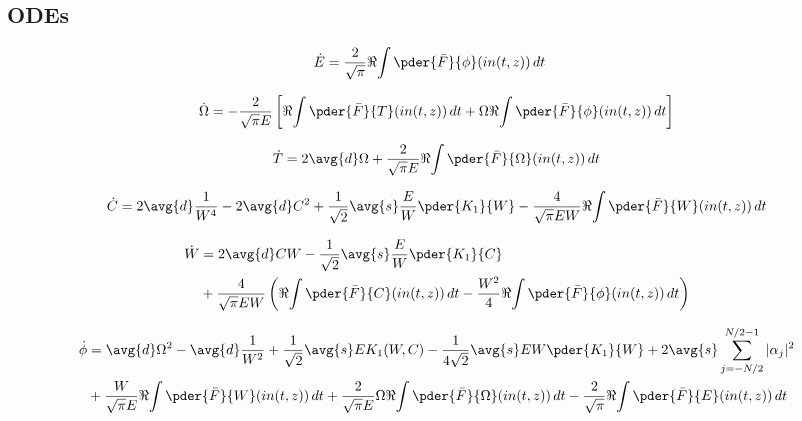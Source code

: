 \subsection{ODEs}


\begin{equation}
\begin{split}
\dot{E} &= \frac{2}{\sqrt{\pi}}\Re{\int \pder{\bar{F}}{\phi} (in(t,z))\,dt}
\end{split}
\end{equation}

\begin{equation}
\begin{split}
 \dot{\Omega} & = - \frac{2}{\sqrt{\pi}E }\left[\Re{\int \pder{\bar{F}}{T} (in(t,z))\,dt}  + \Omega\Re{\int \pder{\bar{F}}{\phi} (in(t,z))\,dt}\right] \\
\end{split}
\end{equation}

\begin{equation}
\begin{split}
 \dot{T} =  2\avg{d} \Omega + \frac{2}{\sqrt{\pi} E}\Re{\int \pder{\bar{F}}{\Omega} (in(t,z))\,dt} \\
\end{split}
\end{equation}

\begin{equation}
\begin{split}
\dot{C} &= 2 \avg{d} \frac{1}{W^4}  - 2 \avg{d} C^2 + \frac{1}{\sqrt{2}}\avg{s} \frac{E}{W} \pder{K_1}{W}  - \frac{4}{\sqrt{\pi}EW}\Re{\int \pder{\bar{F}}{W} (in(t,z))\,dt} \\
\end{split}
\end{equation}

\begin{equation}
\begin{split}
\dot{W} &= 2 \avg{d} C W - \frac{1}{\sqrt{2}} \avg{s} \frac{E}{W} \pder{K_1}{C} \\
&+ \frac{4}{\sqrt{\pi}E W}\left(\Re{\int \pder{\bar{F}}{C} (in(t,z))\,dt} - \frac{W^2}{4}\Re{\int \pder{\bar{F}}{\phi} (in(t,z))\,dt} \right)\\
\end{split}
\end{equation}

\begin{equation}
\begin{split}
\dot{\phi} &= \avg{d} \Omega^2 - \avg{d} \frac{1}{W^2} + \frac{1}{\sqrt{2}} \avg{s} E K_1(W,C) - \frac{1}{4\sqrt{2}} \avg{s} EW \pder{K_1}{W} + 2\avg{s}  \sum_{j=-N/2}^{N/2 - 1} |\alpha_j|^2\\
&+ \frac{W}{\sqrt{\pi}E}\Re{\int \pder{\bar{F}}{W} (in(t,z))\,dt} + \frac{2}{\sqrt{\pi} E}\Omega\Re{\int \pder{\bar{F}}{\Omega} (in(t,z))\,dt} - \frac{2}{\sqrt{\pi}}\Re{\int \pder{\bar{F}}{E} (in(t,z))\,dt}  \\
\end{split}
\end{equation}

